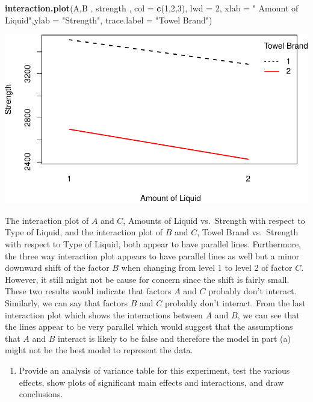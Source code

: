 \documentclass[12pt,]{article}
\newenvironment{Shaded}{\begin{snugshade}}{\end{snugshade}}
\newcommand{\KeywordTok}[1]{\textcolor[rgb]{0.13,0.29,0.53}{\textbf{#1}}}
\newcommand{\DataTypeTok}[1]{\textcolor[rgb]{0.13,0.29,0.53}{#1}}
\newcommand{\DecValTok}[1]{\textcolor[rgb]{0.00,0.00,0.81}{#1}}
\newcommand{\StringTok}[1]{\textcolor[rgb]{0.31,0.60,0.02}{#1}}
\newcommand{\NormalTok}[1]{#1}
\providecommand{\tightlist}{%
  \setlength{\itemsep}{0pt}\setlength{\parskip}{0pt}}
\begin{document}
\begin{Shaded}
\begin{Highlighting}[]
\KeywordTok{interaction.plot}\NormalTok{(A,B , strength , }\DataTypeTok{col =} \KeywordTok{c}\NormalTok{(}\DecValTok{1}\NormalTok{,}\DecValTok{2}\NormalTok{,}\DecValTok{3}\NormalTok{), }\DataTypeTok{lwd =} \DecValTok{2}\NormalTok{, }
                 \DataTypeTok{xlab =} \StringTok{" Amount of Liquid"}\NormalTok{,}\DataTypeTok{ylab =} \StringTok{"Strength"}\NormalTok{, }
                 \DataTypeTok{trace.label =} \StringTok{"Towel Brand"}\NormalTok{)}
\end{Highlighting}
\end{Shaded}

\includegraphics{Markdown_HW_7_files/figure-latex/unnamed-chunk-2-4.pdf}

The interaction plot of \(A\) and \(C\), Amounts of Liquid vs.~Strength
with respect to Type of Liquid, and the interaction plot of \(B\) and
\(C\), Towel Brand vs.~Strength with respect to Type of Liquid, both
appear to have parallel lines. Furthermore, the three way interaction
plot appears to have parallel lines as well but a minor downward shift
of the factor \(B\) when changing from level 1 to level 2 of factor
\(C\). However, it still might not be cause for concern since the shift
is fairly small. These two results would indicate that factors \(A\) and
\(C\) probably don't interact. Similarly, we can say that factors \(B\)
and \(C\) probably don't interact. From the last interaction plot which
shows the interactions between \(A\) and \(B\), we can see that the
lines appear to be very parallel which would suggest that the
assumptions that \(A\) and \(B\) interact is likely to be false and
therefore the model in part (a) might not be the best model to represent
the data.

\begin{enumerate}
\def\labelenumi{(\alph{enumi})}
\setcounter{enumi}{3}
\tightlist
\item
  Provide an analysis of variance table for this experiment, test the
  various effects, show plots of significant main effects and
  interactions, and draw conclusions.
\end{enumerate}
\end{document}
